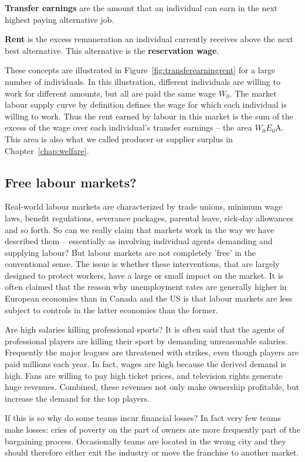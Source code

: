 \begin{DefBox}
\textbf{Transfer earnings} are the amount that an individual can earn in the next highest paying alternative job.

\textbf{Rent} is the excess remuneration an individual currently receives above the next best alternative. This alternative is the \textbf{reservation wage}.
\end{DefBox}

These concepts are illustrated in Figure~\ref{fig:transferearningrent} for a large number of individuals. In this illustration, different individuals are willing to work for different amounts, but all are paid the same wage $W_0$. The market labour supply curve by definition defines the wage for which each individual is willing to work. Thus the rent earned by labour in this market is the sum of the excess of the wage over each individual's transfer earnings -- the area $W_0E_0$A. This area is also what we called producer or supplier surplus in Chapter~\ref{chap:welfare}.



\subsection*{Free labour markets?}

Real-world labour markets are characterized by trade unions, minimum wage laws, benefit regulations, severance packages, parental leave, sick-day allowances and so forth. So can we really claim that markets work in the way we have described them -- essentially as involving individual agents demanding and supplying labour? But labour markets are not completely 'free' in the conventional sense. The issue is whether these interventions, that are largely designed to protect workers, have a large or small impact on the market. It is often claimed that the reason why unemployment rates are generally higher in European economies than in Canada and the US is that labour markets are less subject to controls in the latter economies than the former.

\begin{ApplicationBox}{Are high salaries killing professional sports? \label{app:highsalarysport}}
It is often said that the agents of professional players are killing their sport by demanding unreasonable salaries. Frequently the major leagues are threatened with strikes, even though players are paid millions each year. In fact, wages are high because the derived demand is high. Fans are willing to pay high ticket prices, and television rights generate huge revenues. Combined, these revenues not only make ownership profitable, but increase the demand for the top players.

\bigskip
If this is so why do some teams incur financial losses? In fact very few teams make losses: cries of poverty on the part of owners are more frequently part of the bargaining process. Occasionally teams are located in the wrong city and they should therefore either exit the industry or move the franchise to another market. 
\end{ApplicationBox}

